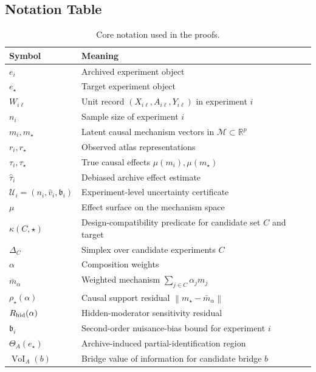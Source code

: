 \documentclass[11pt]{article}
\numberwithin{equation}{section}
\newcommand{\R}{\mathbb R}
\newcommand{\1}{\mathbf 1}
\newcommand{\cM}{\mathcal M}
\newcommand{\cU}{\mathcal U}
\newcommand{\norm}[1]{\left\lVert #1\right\rVert}
\begin{document}
\subsection{Notation Table}

\begin{table}[H]
\centering
\small
\caption{Core notation used in the proofs.}
\begin{tabular}{ll}
\toprule
Symbol & Meaning \\
\midrule
\(e_i\) & Archived experiment object \\
\(e_\star\) & Target experiment object \\
\(W_{i\ell}\) & Unit record \((X_{i\ell},A_{i\ell},Y_{i\ell})\) in experiment \(i\) \\
\(n_i\) & Sample size of experiment \(i\) \\
\(m_i,m_\star\) & Latent causal mechanism vectors in \(\cM\subset\R^p\) \\
\(r_i,r_\star\) & Observed atlas representations \\
\(\tau_i,\tau_\star\) & True causal effects \(\mu(m_i),\mu(m_\star)\) \\
\(\widehat\tau_i\) & Debiased archive effect estimate \\
\(\cU_i=(n_i,\widehat v_i,\mathfrak b_i)\) & Experiment-level uncertainty certificate \\
\(\mu\) & Effect surface on the mechanism space \\
\(\kappa(C,\star)\) & Design-compatibility predicate for candidate set \(C\) and target \\
\(\Delta_C\) & Simplex over candidate experiments \(C\) \\
\(\alpha\) & Composition weights \\
\(\bar m_\alpha\) & Weighted mechanism \(\sum_{j\in C}\alpha_jm_j\) \\
\(\rho_\star(\alpha)\) & Causal support residual \(\norm{m_\star-\bar m_\alpha}\) \\
\(R_{\rm hid}(\alpha)\) & Hidden-moderator sensitivity residual \\
\(\mathfrak b_i\) & Second-order nuisance-bias bound for experiment \(i\) \\
\(\Theta_A(e_\star)\) & Archive-induced partial-identification region \\
\(\operatorname{VoI}_A(b)\) & Bridge value of information for candidate bridge \(b\) \\
\bottomrule
\end{tabular}
\end{table}
\end{document}
